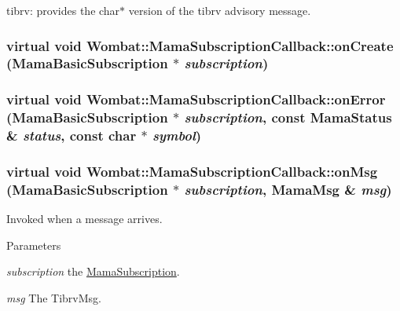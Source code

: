 tibrv: provides the char$\ast$ version of the tibrv advisory message. \hypertarget{classWombat_1_1MamaSubscriptionCallback_a43dfe37a97f29c7f0e4a98ea119d8cd8}{
\subsubsection[{onCreate}]{\setlength{\rightskip}{0pt plus 5cm}virtual void Wombat::MamaSubscriptionCallback::onCreate ({\bf MamaBasicSubscription} $\ast$ {\em subscription})}}
\label{classWombat_1_1MamaSubscriptionCallback_a43dfe37a97f29c7f0e4a98ea119d8cd8}
\hypertarget{classWombat_1_1MamaSubscriptionCallback_ac1fe8bc531ec11df516ef56781d6b10d}{
\subsubsection[{onError}]{\setlength{\rightskip}{0pt plus 5cm}virtual void Wombat::MamaSubscriptionCallback::onError ({\bf MamaBasicSubscription} $\ast$ {\em subscription}, \/  const {\bf MamaStatus} \& {\em status}, \/  const char $\ast$ {\em symbol})}}
\label{classWombat_1_1MamaSubscriptionCallback_ac1fe8bc531ec11df516ef56781d6b10d}
\hypertarget{classWombat_1_1MamaSubscriptionCallback_a1a8180641b743dabe772f78836722be0}{
\subsubsection[{onMsg}]{\setlength{\rightskip}{0pt plus 5cm}virtual void Wombat::MamaSubscriptionCallback::onMsg ({\bf MamaBasicSubscription} $\ast$ {\em subscription}, \/  {\bf MamaMsg} \& {\em msg})}}
\label{classWombat_1_1MamaSubscriptionCallback_a1a8180641b743dabe772f78836722be0}


Invoked when a message arrives. 
\begin{DoxyParams}{Parameters}
\item[{\em subscription}]the {\ttfamily \hyperlink{classWombat_1_1MamaSubscription}{MamaSubscription}}. \item[{\em msg}]The TibrvMsg. \end{DoxyParams}

